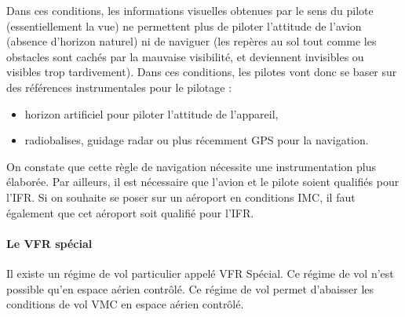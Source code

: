 		Dans ces conditions, les informations visuelles obtenues par le sens du pilote (essentiellement la vue) ne permettent plus de piloter l'attitude de l'avion (absence d'horizon naturel) ni de naviguer (les repères au sol tout comme les obstacles sont cachés par la mauvaise visibilité, et deviennent invisibles ou visibles trop tardivement). Dans ces conditions, les pilotes vont donc se baser sur des références instrumentales pour le pilotage :
		\begin{itemize}
		\item horizon artificiel pour piloter l'attitude de l'appareil,
		\item radiobalises, guidage radar ou plus récemment GPS pour la navigation.
		\end{itemize}
		
		On constate que cette règle de navigation nécessite une instrumentation plus élaborée. Par ailleurs, il est nécessaire que l'avion et le pilote soient qualifiés pour l'IFR. Si on souhaite se poser sur un aéroport en conditions IMC, il faut également que cet aéroport soit qualifié pour l'IFR.
		
		
		
		\paragraph{Le VFR spécial} 
		Il existe un régime de vol particulier appelé VFR Spécial. Ce régime de vol n'est possible qu'en espace aérien contrôlé. Ce régime de vol permet d'abaisser les conditions de vol VMC en espace aérien contrôlé.
		
		
